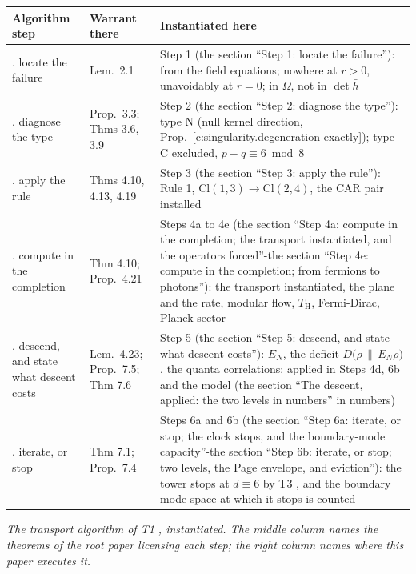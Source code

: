 \documentclass[11pt]{article}
\theoremstyle{definition}
\theoremstyle{plain}
\providecommand{\Cl}{}\renewcommand{\Cl}{\mathrm{Cl}}
\providecommand{\EN}{}\renewcommand{\EN}{E_{N}}
\providecommand{\TH}{}\renewcommand{\TH}{T_{\mathrm{H}}}
\providecommand{\hb}{}\renewcommand{\hb}{\bar{h}}
\providecommand{\rel}{}\renewcommand{\rel}[2]{D\bigl(#1 \,\|\, #2\bigr)}
\begin{document}
 \begin{tabular}{>{ \arraybackslash}p{2.9cm}>{ \arraybackslash}p{3.2cm}>{ \arraybackslash}p{6.6cm}}
\toprule
Algorithm step \cite[\S 8.1]{ButlerT1} & Warrant there & Instantiated here \\
\midrule
1. locate the failure & Lem.~2.1 & Step 1 (the section ``Step 1: locate the failure''): from the field equations; nowhere at $r > 0$, unavoidably at $r = 0$; in $\Omega$, not in $\det \hb$ \\
2. diagnose the type & Prop.~3.3; Thms 3.6, 3.9 & Step 2 (the section ``Step 2: diagnose the type''): type N (null kernel direction, Prop.~\ref{c:singularity.degeneration-exactly}); type C excluded, $p - q \equiv 6 \bmod 8$ \\
3. apply the rule & Thms 4.10, 4.13, 4.19 & Step 3 (the section ``Step 3: apply the rule''): Rule 1, $\Cl(1,3) \to \Cl(2,4)$, the CAR pair installed \\
4. compute in the completion & Thm 4.10; Prop.~4.21 & Steps 4a to 4e (the section ``Step 4a: compute in the completion; the transport instantiated, and the operators forced''-the section ``Step 4e: compute in the completion; from fermions to photons''): the transport instantiated, the plane and the rate, modular flow, $\TH$, Fermi-Dirac, Planck sector \\
5. descend, and state what descent costs & Lem.~4.23; Prop.~7.5; Thm 7.6 & Step 5 (the section ``Step 5: descend, and state what descent costs''): $\EN$, the deficit $\rel{\rho}{\EN\rho}$, the quanta correlations; applied in Steps 4d, 6b and the model (the section ``The descent, applied: the two levels in numbers'' in numbers) \\
6. iterate, or stop & Thm 7.1; Prop.~7.4 & Steps 6a and 6b (the section ``Step 6a: iterate, or stop; the clock stops, and the boundary-mode capacity''-the section ``Step 6b: iterate, or stop; two levels, the Page envelope, and eviction''): the tower stops at $d \equiv 6$ by T3 \cite{ButlerT3}, and the boundary mode space at which it stops is counted \\
\bottomrule
\end{tabular}

\emph{The transport algorithm of T1 \cite{ButlerT1}, instantiated. The middle column names the theorems of the root paper licensing each step; the right column names where this paper executes it.}
\end{document}
